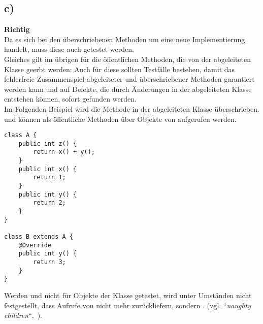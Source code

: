 \subsection*{c)}



\textbf{Richtig}\\
Da es sich bei den überschriebenen Methoden um eine neue Implementierung handelt, muss diese auch getestet werden.\\

\noindent
Gleiches gilt im übrigen für die öffentlichen Methoden, die von der abgeleiteten Klasse geerbt werden: Auch für diese sollten Testfälle bestehen, damit das fehlerfreie Zusammenspiel abgeleiteter und überschriebener Methoden garantiert werden kann und auf Defekte, die durch Änderungen in der abgeleiteten Klasse entstehen können, sofort gefunden werden.\\
Im Folgenden Beispiel wird die Methode  in der abgeleiteten Klasse überschrieben.  und  können als öffentliche Methoden über Objekte von  aufgerufen werden.\\

\begin{verbatim}
class A {
    public int z() {
        return x() + y();
    }
    public int x() {
        return 1;
    }
    public int y() {
        return 2;
    }
}

class B extends A {
    @Override
    public int y() {
        return 3;
    }
}
\end{verbatim}

\noindent
Werden  und  nicht für Objekte der Klasse  getestet, wird unter Umständen nicht festgestellt, dass Aufrufe von  nicht mehr  zurückliefern, sondern . (vgl. ``\textit{naughty children}``,~\cite[Table 17.2, 843]{Bin99}).


